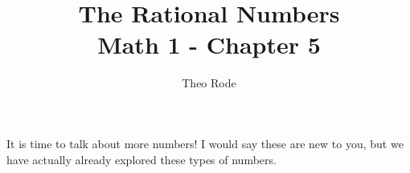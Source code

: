 \documentclass{article}
\title{\textbf{The Rational Numbers} \\ \large Math 1 - Chapter 5}
\author{Theo Rode}
\date{}
\begin{document}
\maketitle 

It is time to talk about more numbers! I would say these are new to you, but we have actually already explored these types of numbers. 








\end{document}
